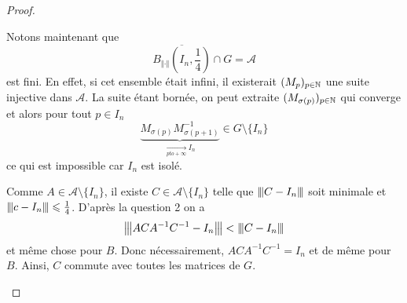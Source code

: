 \begin{proof}
\begin{enumerate}
		Notons maintenant que 
		\begin{equation}\overline{B_{\Vert\cdot\Vert}(I_{n},\frac{1}{4})}\cap G=\mathcal{A}\end{equation}
		est fini. En effet, si cet ensemble était infini, il existerait $(M_{p})_{p\in\mathbb{N}}$ une suite injective dans $\mathcal{A}$. La suite étant bornée, on peut extraite $(M_{\sigma(p)})_{p\in\mathbb{N}}$ qui converge et alors pour tout $p\in I_{n}$
		\begin{equation}\underbrace{M_{\sigma(p)}M_{\sigma(p+1)}^{-1}}_{\xrightarrow[pto+\infty]{}I_{n}}\in G\setminus\{I_{n}\}\end{equation}
		ce qui est impossible car $I_{n}$ est isolé.

		Comme $A\in \mathcal{A}\setminus\{I_{n}\}$, il existe $C\in\mathcal{A}\setminus\{I_{n}\}$ telle que ${\left\vert\kern-0.25ex\left\vert\kern-0.25ex\left\vert{}C-I_{n} \right\vert\kern-0.25ex\right\vert\kern-0.25ex\right\vert}$ soit minimale et ${\left\vert\kern-0.25ex\left\vert\kern-0.25ex\left\vert{}c-I_{n} \right\vert\kern-0.25ex\right\vert\kern-0.25ex\right\vert}\leqslant\frac{1}{4}$. D'après la question 2 on a 
		\begin{equation}{\left\vert\kern-0.25ex\left\vert\kern-0.25ex\left\vert{}ACA^{-1}C^{-1}-I_{n} \right\vert\kern-0.25ex\right\vert\kern-0.25ex\right\vert}<{\left\vert\kern-0.25ex\left\vert\kern-0.25ex\left\vert{}C-I_{n} \right\vert\kern-0.25ex\right\vert\kern-0.25ex\right\vert}\end{equation}
		et même chose pour $B$. Donc nécessairement, $ACA^{-1}C^{-1}=I_{n}$ et de même pour $B$. Ainsi, $C$ commute avec toutes les matrices de $G$.
	\end{enumerate}
\end{proof}

